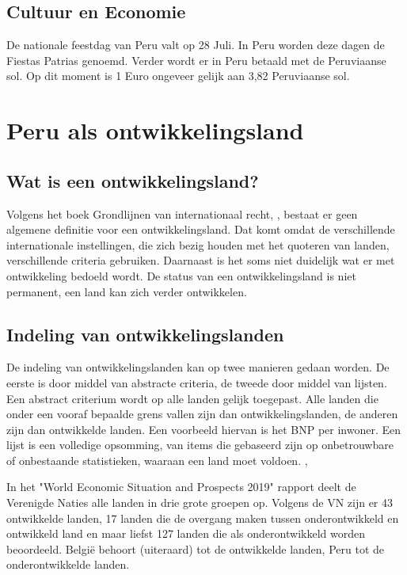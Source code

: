 \subsection{Cultuur en Economie}
De nationale feestdag van Peru valt op 28 Juli. In Peru worden deze dagen de Fiestas Patrias genoemd. \autocite{dosmanosperu2018} Verder wordt er in Peru betaald met de Peruviaanse sol. Op dit moment is 1 Euro ongeveer gelijk aan 3,82 Peruviaanse sol.

\section{Peru als ontwikkelingsland}
\subsection{Wat is een ontwikkelingsland?}
Volgens het boek Grondlijnen van internationaal recht, \autocite{MarcJ.Bossuyt2005}, bestaat er geen algemene definitie voor een ontwikkelingsland. Dat komt omdat de verschillende internationale instellingen, die zich bezig houden met het quoteren van landen, verschillende criteria gebruiken. Daarnaast is het soms niet duidelijk wat er met ontwikkeling bedoeld wordt.
De status van een ontwikkelingsland is niet permanent, een land kan zich verder ontwikkelen.

\subsection{Indeling van ontwikkelingslanden}
De indeling van ontwikkelingslanden kan op twee manieren gedaan worden. De eerste is door middel van abstracte criteria, de tweede door middel van lijsten. Een abstract criterium wordt op alle landen gelijk toegepast. Alle landen die onder een vooraf bepaalde grens vallen zijn dan ontwikkelingslanden, de anderen zijn dan ontwikkelde landen. Een voorbeeld hiervan is het BNP per inwoner. Een lijst is een volledige opsomming, van items die gebaseerd zijn op onbetrouwbare of onbestaande statistieken, waaraan een land moet voldoen. \autocite{MarcJ.Bossuyt2005},

In het "World Economic Situation and Prospects 2019" rapport \autocite{unitednations2019} deelt de Verenigde Naties alle landen in drie grote groepen op. Volgens de VN zijn er 43 ontwikkelde landen, 17 landen die de overgang maken tussen onderontwikkeld en ontwikkeld land en maar liefst 127 landen die als onderontwikkeld worden beoordeeld. België behoort (uiteraard) tot de ontwikkelde landen, Peru tot de onderontwikkelde landen. \autocite{unitednations2019}

